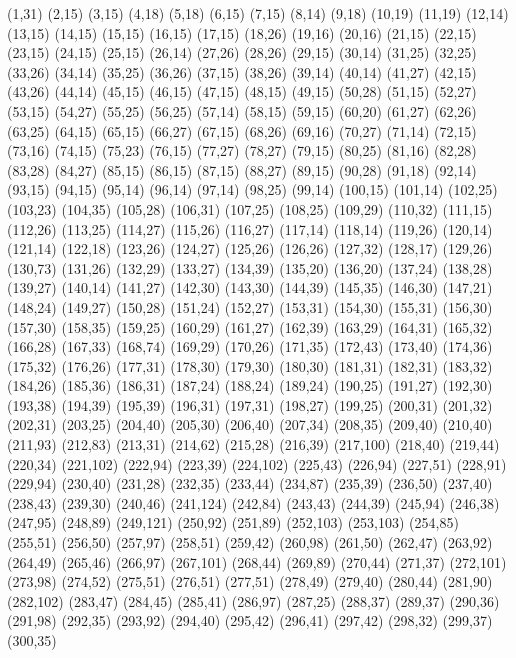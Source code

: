 (1,31)
(2,15)
(3,15)
(4,18)
(5,18)
(6,15)
(7,15)
(8,14)
(9,18)
(10,19)
(11,19)
(12,14)
(13,15)
(14,15)
(15,15)
(16,15)
(17,15)
(18,26)
(19,16)
(20,16)
(21,15)
(22,15)
(23,15)
(24,15)
(25,15)
(26,14)
(27,26)
(28,26)
(29,15)
(30,14)
(31,25)
(32,25)
(33,26)
(34,14)
(35,25)
(36,26)
(37,15)
(38,26)
(39,14)
(40,14)
(41,27)
(42,15)
(43,26)
(44,14)
(45,15)
(46,15)
(47,15)
(48,15)
(49,15)
(50,28)
(51,15)
(52,27)
(53,15)
(54,27)
(55,25)
(56,25)
(57,14)
(58,15)
(59,15)
(60,20)
(61,27)
(62,26)
(63,25)
(64,15)
(65,15)
(66,27)
(67,15)
(68,26)
(69,16)
(70,27)
(71,14)
(72,15)
(73,16)
(74,15)
(75,23)
(76,15)
(77,27)
(78,27)
(79,15)
(80,25)
(81,16)
(82,28)
(83,28)
(84,27)
(85,15)
(86,15)
(87,15)
(88,27)
(89,15)
(90,28)
(91,18)
(92,14)
(93,15)
(94,15)
(95,14)
(96,14)
(97,14)
(98,25)
(99,14)
(100,15)
(101,14)
(102,25)
(103,23)
(104,35)
(105,28)
(106,31)
(107,25)
(108,25)
(109,29)
(110,32)
(111,15)
(112,26)
(113,25)
(114,27)
(115,26)
(116,27)
(117,14)
(118,14)
(119,26)
(120,14)
(121,14)
(122,18)
(123,26)
(124,27)
(125,26)
(126,26)
(127,32)
(128,17)
(129,26)
(130,73)
(131,26)
(132,29)
(133,27)
(134,39)
(135,20)
(136,20)
(137,24)
(138,28)
(139,27)
(140,14)
(141,27)
(142,30)
(143,30)
(144,39)
(145,35)
(146,30)
(147,21)
(148,24)
(149,27)
(150,28)
(151,24)
(152,27)
(153,31)
(154,30)
(155,31)
(156,30)
(157,30)
(158,35)
(159,25)
(160,29)
(161,27)
(162,39)
(163,29)
(164,31)
(165,32)
(166,28)
(167,33)
(168,74)
(169,29)
(170,26)
(171,35)
(172,43)
(173,40)
(174,36)
(175,32)
(176,26)
(177,31)
(178,30)
(179,30)
(180,30)
(181,31)
(182,31)
(183,32)
(184,26)
(185,36)
(186,31)
(187,24)
(188,24)
(189,24)
(190,25)
(191,27)
(192,30)
(193,38)
(194,39)
(195,39)
(196,31)
(197,31)
(198,27)
(199,25)
(200,31)
(201,32)
(202,31)
(203,25)
(204,40)
(205,30)
(206,40)
(207,34)
(208,35)
(209,40)
(210,40)
(211,93)
(212,83)
(213,31)
(214,62)
(215,28)
(216,39)
(217,100)
(218,40)
(219,44)
(220,34)
(221,102)
(222,94)
(223,39)
(224,102)
(225,43)
(226,94)
(227,51)
(228,91)
(229,94)
(230,40)
(231,28)
(232,35)
(233,44)
(234,87)
(235,39)
(236,50)
(237,40)
(238,43)
(239,30)
(240,46)
(241,124)
(242,84)
(243,43)
(244,39)
(245,94)
(246,38)
(247,95)
(248,89)
(249,121)
(250,92)
(251,89)
(252,103)
(253,103)
(254,85)
(255,51)
(256,50)
(257,97)
(258,51)
(259,42)
(260,98)
(261,50)
(262,47)
(263,92)
(264,49)
(265,46)
(266,97)
(267,101)
(268,44)
(269,89)
(270,44)
(271,37)
(272,101)
(273,98)
(274,52)
(275,51)
(276,51)
(277,51)
(278,49)
(279,40)
(280,44)
(281,90)
(282,102)
(283,47)
(284,45)
(285,41)
(286,97)
(287,25)
(288,37)
(289,37)
(290,36)
(291,98)
(292,35)
(293,92)
(294,40)
(295,42)
(296,41)
(297,42)
(298,32)
(299,37)
(300,35)
